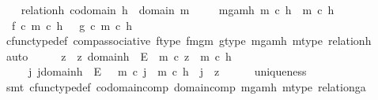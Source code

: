 \begin{isabellebody}
\ \ \isamarkupfalse%
\ relation{\isacharunderscore}{\kern0pt}h{\isacharcolon}{\kern0pt}\ {\isachardoublequoteopen}codomain\ h{}\ {\isacharequal}{\kern0pt}\ domain\ m{\isachardoublequoteclose}\ \isanewline
\ \ \isamarkupfalse%
\ m{\isacharunderscore}{\kern0pt}ga{\isacharunderscore}{\kern0pt}mh{\isacharcolon}{\kern0pt}\ {\isachardoublequoteopen}m\ {\isasymcirc}\isactrlsub c\ h{}\ {\isacharequal}{\kern0pt}\ m\ {\isasymcirc}\isactrlsub c\ h{}{\isachardoublequoteclose}\ \ \ \isanewline
\ \ \isamarkupfalse%
\ \ {\isachardoublequoteopen}f\ {\isasymcirc}\isactrlsub c\ m\ {\isasymcirc}\isactrlsub c\ h{}\ {\isacharequal}{\kern0pt}\ \ g\ {\isasymcirc}\isactrlsub c\ m\ {\isasymcirc}\isactrlsub c\ h{}{\isachardoublequoteclose}\isanewline
\ \ \ \ \isamarkupfalse%
\ cfunc{\isacharunderscore}{\kern0pt}type{\isacharunderscore}{\kern0pt}def\ comp{\isacharunderscore}{\kern0pt}associative\ f{\isacharunderscore}{\kern0pt}type\ fm{\isacharunderscore}{\kern0pt}gm\ g{\isacharunderscore}{\kern0pt}type\ m{\isacharunderscore}{\kern0pt}ga{\isacharunderscore}{\kern0pt}mh\ m{\isacharunderscore}{\kern0pt}type\ relation{\isacharunderscore}{\kern0pt}h\ \isamarkupfalse%
\ auto\isanewline
\ \ \isamarkupfalse%
\ \isamarkupfalse%
\ z\ \ {\isachardoublequoteopen}z{\isacharcolon}{\kern0pt}\ domain{\isacharparenleft}{\kern0pt}h{}{\isacharparenright}{\kern0pt}\ {\isasymrightarrow}\ E\ {\isasymand}\ m\ {\isasymcirc}\isactrlsub c\ z\ {\isacharequal}{\kern0pt}\ m\ {\isasymcirc}\isactrlsub c\ h{}\ {\isasymand}\ \isanewline
\ \ \ \ {\isacharparenleft}{\kern0pt}{\isasymforall}\ j{\isachardot}{\kern0pt}\ j{\isacharcolon}{\kern0pt}domain{\isacharparenleft}{\kern0pt}h{}{\isacharparenright}{\kern0pt}\ {\isasymrightarrow}\ E\ {\isasymand}\ \ m\ {\isasymcirc}\isactrlsub c\ j\ {\isacharequal}{\kern0pt}\ m\ {\isasymcirc}\isactrlsub c\ h{}\ {\isasymlongrightarrow}\ j\ {\isacharequal}{\kern0pt}\ z{\isacharparenright}{\kern0pt}{\isachardoublequoteclose}\isanewline
\ \ \ \ \isamarkupfalse%
\ uniqueness\ \isamarkupfalse%
\ {\isacharparenleft}{\kern0pt}smt\ cfunc{\isacharunderscore}{\kern0pt}type{\isacharunderscore}{\kern0pt}def\ codomain{\isacharunderscore}{\kern0pt}comp\ domain{\isacharunderscore}{\kern0pt}comp\ m{\isacharunderscore}{\kern0pt}ga{\isacharunderscore}{\kern0pt}mh\ m{\isacharunderscore}{\kern0pt}type\ relation{\isacharunderscore}{\kern0pt}ga{\isacharparenright}{\kern0pt}\isanewline

\end{isabellebody}
